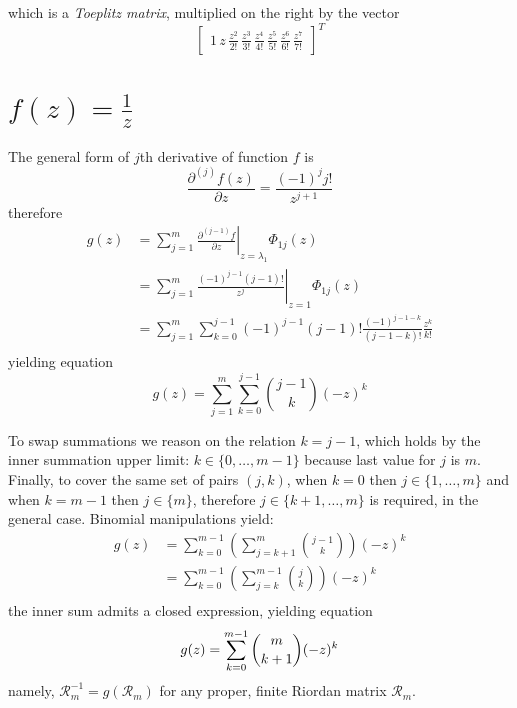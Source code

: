 which is a \emph{Toeplitz matrix}, multiplied on the right by the vector 
$$\left[\begin{matrix}1\,z\,\frac{z^{2}}{2!}\,\frac{z^{3}}{3!}\,\frac{z^{4}}{4!}\,\frac{z^{5}}{5!}\,\frac{z^{6}}{6!}\,\frac{z^{7}}{7!}\end{matrix}\right]^{T}$$


\section{$f(z)=\frac{1}{z}$}

The general form of $j$th derivative of function $f$ is 
$$\frac{\partial^{(j)}{f}(z)}{\partial{z}} = \frac{(-1)^{j}j!}{z^{j+1}}$$ 
therefore
\begin{displaymath}
\begin{split}
  g(z) &= \sum_{j=1}^{m}{ \left. \frac{\partial^{(j-1)}{f}}{\partial{z}} \right|_{z=\lambda_{1}}\Phi_{1j}(z)} \\
       &= \sum_{j=1}^{m}{ \left. \frac{(-1)^{j-1}(j-1)!}{z^{j}} \right|_{z=1}\Phi_{1j}(z)} \\
       &= \sum_{j=1}^{m}{\sum_{k=0}^{j-1}{(-1)^{j-1}(j-1)!\frac{(-1)^{j-1-k}}{(j-1-k)!}\frac{z^{k}}{k!}}} \\
\end{split}
\end{displaymath}
yielding equation
\begin{equation}
  g(z) = \sum_{j=1}^{m}{\sum_{k=0}^{j-1}{{{j-1}\choose{k}}(-z)^{k}}} 
\end{equation}

To swap summations we reason on the relation $k=j-1$, which holds by the inner summation upper limit:
$k\in \lbrace 0,\ldots,m-1 \rbrace$ because last value for $j$ is $m$. Finally, to cover the same set 
of pairs $(j, k)$, when $k=0$ then $j\in \lbrace 1,\ldots,m \rbrace$ and when $k=m-1$ then 
$j\in \lbrace m \rbrace$, therefore $j\in \lbrace k+1, \ldots, m \rbrace$ is required, in the general case.
Binomial manipulations yield:
\begin{displaymath}
\begin{split}
  g(z) &= \sum_{k=0}^{m-1}{\left(\sum_{j=k+1}^{m}{{{j-1}\choose{k}}}\right)(-z)^{k}} \\
       &= \sum_{k=0}^{m-1}{\left(\sum_{j=k}^{m-1}{{{j}\choose{k}}}\right)(-z)^{k}} \\
\end{split}
\end{displaymath}
the inner sum admits a closed expression, yielding equation
\begin{equation}
  g(z) = \sum_{k=0}^{m-1}{{{m}\choose{k+1}}(-z)^{k}} \\
\end{equation}
namely, $\mathcal{R}_{m}^{-1}=g(\mathcal{R}_{m})$ for any proper, finite Riordan matrix $\mathcal{R}_{m}$.

